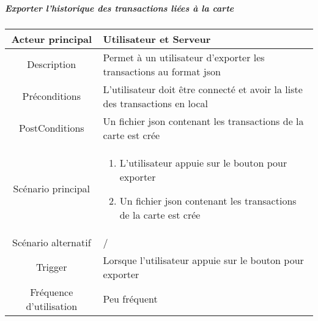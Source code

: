 \documentclass{article}
\begin{document}
\subparagraph{Exporter l'historique des transactions liées à la carte}
    \begin{table}[h]
        \begin{tabular}{|c|p{10cm}|}
        \hline
        Acteur principal& Utilisateur et Serveur    \\
        \hline
        Description&  Permet à un utilisateur d'exporter les transactions au format json  \\
        \hline
        Préconditions& L'utilisateur doit être connecté et avoir la liste des transactions en local \\
        \hline
        PostConditions&  Un fichier json contenant les transactions de la carte est crée   \\
        \hline
        Scénario principal& 
                \begin{enumerate}
                    \item L'utilisateur appuie sur le bouton pour exporter
                    \item Un fichier json contenant les transactions de la carte est crée
                \end{enumerate}     \\
        \hline
        Scénario alternatif&  /    \\
        \hline
        Trigger&   Lorsque l'utilisateur appuie sur le bouton pour exporter  \\
        \hline
        Fréquence d'utilisation&    Peu fréquent  \\
        \hline
        \end{tabular}
    \end{table}

\newpage
\end{document}
